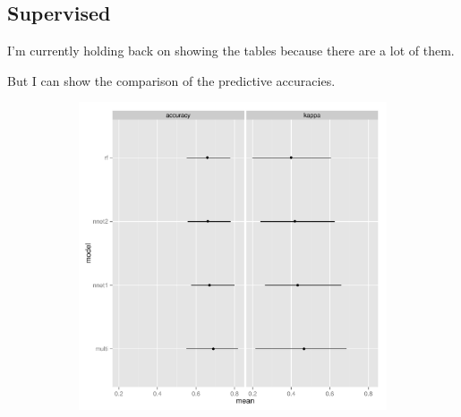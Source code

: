 \documentclass{article}\usepackage{graphicx, color}
\begin{document}
\subsection{Supervised}

I'm currently holding back on showing the tables because there are a lot of them.

But I can show the comparison of the predictive accuracies.




\begin{figure}[t]
  \centering
  \begin{subfigure}[b]{0.5\textwidth}
    \centering
    \caption{}
    \includegraphics[width = \textwidth]{figure/resamp1}
    \label{fig:resamp1}
  \end{subfigure}%
  \begin{subfigure}[b]{0.5\textwidth}
    \centering
    \caption{}

\end{subfigure}
\end{figure}
\end{document}
